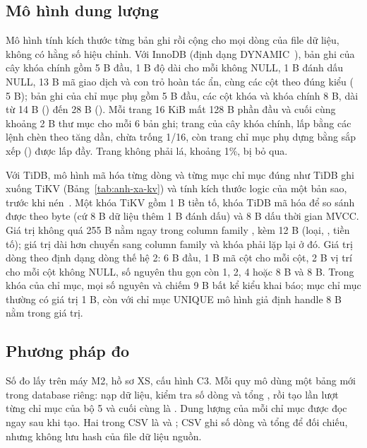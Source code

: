 \subsection{Mô hình dung lượng}
Mô hình tính kích thước từng bản ghi rồi cộng cho mọi dòng của file dữ liệu, không có hằng số hiệu chỉnh. Với InnoDB (định dạng DYNAMIC~\cite{mysql_innodb}), bản ghi của cây khóa chính gồm 5 B đầu, 1 B độ dài cho mỗi  không NULL, 1 B đánh dấu NULL, 13 B mã giao dịch và con trỏ hoàn tác ẩn, cùng các cột theo đúng kiểu ( 5 B); bản ghi của chỉ mục phụ gồm 5 B đầu, các cột khóa và khóa chính 8 B, dài từ 14 B () đến 28 B (). Mỗi trang 16 KiB mất 128 B phần đầu và cuối cùng khoảng 2 B thư mục cho mỗi 6 bản ghi; trang của cây khóa chính, lấp bằng các lệnh chèn theo  tăng dần, chừa trống 1/16, còn trang chỉ mục phụ dựng bằng sắp xếp () được lấp đầy. Trang không phải lá, khoảng 1\%, bị bỏ qua.

Với TiDB, mô hình mã hóa từng dòng và từng mục chỉ mục đúng như TiDB ghi xuống TiKV (Bảng~\ref{tab:anh-xa-kv}) và tính kích thước logic của một bản sao, trước khi nén~\cite{tikv_storage}. Một khóa TiKV gồm 1 B tiền tố, khóa TiDB mã hóa để so sánh được theo byte (cứ 8 B dữ liệu thêm 1 B đánh dấu) và 8 B dấu thời gian MVCC. Giá trị không quá 255 B nằm ngay trong column family , kèm 12 B (loại, , tiền tố); giá trị dài hơn chuyển sang column family  và khóa phải lặp lại ở đó. Giá trị dòng theo định dạng dòng thế hệ 2: 6 B đầu, 1 B mã cột cho mỗi cột, 2 B vị trí cho mỗi cột không NULL, số nguyên thu gọn còn 1, 2, 4 hoặc 8 B và  8 B. Trong khóa của chỉ mục, mọi số nguyên và  chiếm 9 B bất kể kiểu khai báo; mục chỉ mục thường có giá trị 1 B, còn với chỉ mục UNIQUE mô hình giả định handle 8 B nằm trong giá trị.

\subsection{Phương pháp đo}
Số đo lấy trên máy M2, hồ sơ XS, cấu hình C3. Mỗi quy mô dùng một bảng mới trong database riêng: nạp dữ liệu, kiểm tra số dòng và tổng , rồi tạo lần lượt từng chỉ mục của bộ 5 và cuối cùng là . Dung lượng của mỗi chỉ mục được đọc ngay sau khi tạo. Hai  trong CSV là  và ; CSV ghi số dòng và tổng  để đối chiếu, nhưng không lưu hash của file dữ liệu nguồn.

